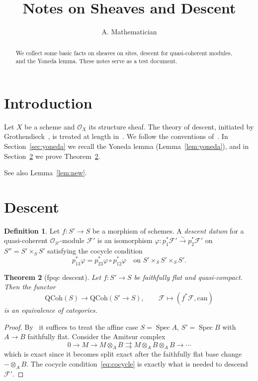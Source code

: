 \documentclass[11pt]{amsart}
\title{Notes on Sheaves and Descent}
\author{A. Mathematician}
\newtheorem{theorem}{Theorem}[section]
\theoremstyle{definition}
\newtheorem{definition}[theorem]{Definition}
\theoremstyle{remark}
\newcommand{\Spec}{\operatorname{Spec}}
\newcommand{\cO}{\mathcal{O}}
\newcommand{\cF}{\mathcal{F}}
\begin{document}
\maketitle

\begin{abstract}
We collect some basic facts on sheaves on sites, descent for quasi-coherent
modules, and the Yoneda lemma. These notes serve as a test document.
\end{abstract}

\tableofcontents

\section{Introduction}\label{sec:intro}
Let $X$ be a scheme and $\cO_X$ its structure sheaf. The theory of descent,
initiated by Grothendieck~\cite{SGA1}, is treated at length in~\cite{Vistoli}.
We follow the conventions of~\cite{Stacks}. In Section~\ref{sec:yoneda} we
recall the Yoneda lemma (Lemma~\ref{lem:yoneda}), and in
Section~\ref{sec:descent} we prove Theorem~\ref{thm:fpqc}.


See also Lemma~\ref{lem:new}.\label{lem:new}\label{sec:intro}

\section{Descent}\label{sec:descent}
\begin{definition}\label{def:descent-datum}
Let $f\colon S'\to S$ be a morphism of schemes. A \emph{descent datum} for a
quasi-coherent $\cO_{S'}$-module $\cF'$ is an isomorphism
$\varphi\colon p_1^*\cF'\xrightarrow{\sim}p_2^*\cF'$ on $S''=S'\times_S S'$
satisfying the cocycle condition
\begin{equation}\label{eq:cocycle}
p_{13}^*\varphi = p_{23}^*\varphi\circ p_{12}^*\varphi
\quad\text{on } S'\times_S S'\times_S S'.
\end{equation}
\end{definition}

\begin{theorem}[fpqc descent]\label{thm:fpqc}
Let $f\colon S'\to S$ be faithfully flat and quasi-compact. Then the functor
\[
\mathrm{QCoh}(S)\longrightarrow \mathrm{QCoh}(S'\to S),\qquad
\cF\longmapsto (f^*\cF,\mathrm{can})
\]
is an equivalence of categories.
\end{theorem}

\begin{proof}
By~\cite[Tag 023N]{Stacks} it suffices to treat the affine case
$S=\Spec A$, $S'=\Spec B$ with $A\to B$ faithfully flat. Consider the
Amitsur complex
\begin{equation}\label{eq:amitsur}
0\to M\to M\otimes_A B\rightrightarrows M\otimes_A B\otimes_A B
\to\cdots
\end{equation}
which is exact since it becomes split exact after the faithfully flat base
change $-\otimes_A B$. The cocycle condition~\eqref{eq:cocycle} is exactly
what is needed to descend $\cF'$.
\end{proof}
\end{document}
